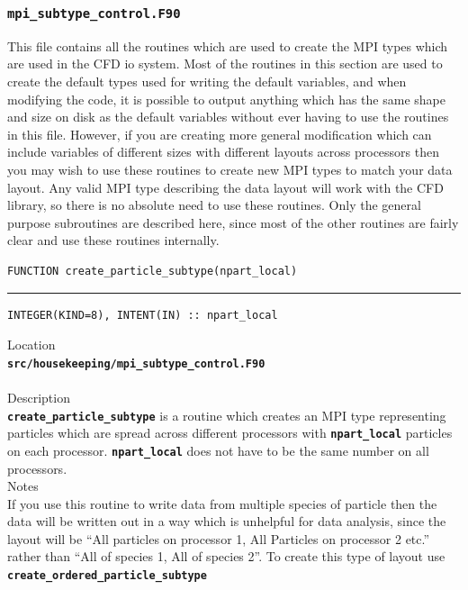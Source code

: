 \documentclass[12pt,a4paper]{article}
\newcommand{\HRule}{\rule{\linewidth}{0.5mm}}
\newcommand{\inlinecode}[1]{{\color{warwickred} \bf\texttt{#1}}}
\newcommand{\codedef}{\begin{Verbatim}[formatcom=\color{warwickred},fontsize=\Large,hfuzz=0pt]}
\newcommand{\coderule}{
{\color{warwickred}\vspace{-0.5cm}\HRule}
\codedef}
\begin{document}
\subsubsection{\inlinecode{mpi\_subtype\_control.F90}}
This file contains all the routines which are used to create the MPI types
which are used in the CFD io system. Most of the routines in this section are
used to create the default types used for writing the default variables, and
when modifying the code, it is possible to output anything which has the same
shape and size on disk as the default variables without ever having to use the
routines in this file. However, if you are creating more general modification
which can include variables of different sizes with different layouts across
processors then you may wish to use these routines to create new MPI types to
match your data layout. Any valid MPI type describing the data layout will work
with the CFD library, so there is no absolute need to use these routines. Only
the general purpose subroutines are described here, since most of the other
routines are fairly clear and use these routines internally.

\pagebreak
\codedef
FUNCTION create_particle_subtype(npart_local)
\end{Verbatim}
\coderule
INTEGER(KIND=8), INTENT(IN) :: npart_local
\end{Verbatim}
\vspace{1cm}
{\Large Location\\}
\inlinecode{src/housekeeping/mpi\_subtype\_control.F90}\\
\\[0.5cm]
{\Large Description\\}
\inlinecode{create\_particle\_subtype} is a routine which creates an MPI type
representing particles which are spread across different processors with
\inlinecode{npart\_local} particles on each
processor. \inlinecode{npart\_local} does not have to be the same number on all
processors.
\\[0.5cm]
{\Large Notes\\}
If you use this routine to write data from multiple species of particle then
the data will be written out in a way which is unhelpful for data analysis,
since the layout will be ``All particles on processor 1, All Particles on
processor 2 etc.'' rather than ``All of species 1, All of species 2''. To create
this type of layout use \inlinecode{create\_ordered\_particle\_subtype}
\end{document}
